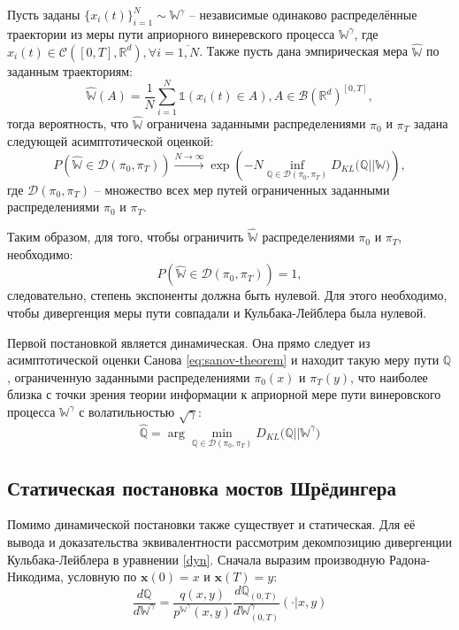 \begin{theorem}[Санов]
    Пусть заданы $\{x_i(t)\}^N_{i=1}\sim \mathbb{W}^\gamma$ -- независимые одинаково распределённые траектории из меры пути априорного винеревского процесса $\mathbb{W}^\gamma$, где $x_i (t) \in \mathcal{C}([0,T], \mathbb{R}^d), \forall i=\overline{1, N}$. Также пусть дана эмпирическая мера $\hat{\mathbb{W}}$ по заданным траекториям:
    \begin{equation*}
        \hat{\mathbb{W}}(A)=\frac{1}{N}\sum_{i=1}^N\mathds{1}\left(x_i(t)\in A\right), A\in \mathcal{B}(\mathbb{R}^d)^{[0,T]},
    \end{equation*}
    тогда вероятность, что $\hat{\mathbb{W}}$ ограничена заданными распределениями $\pi_0$ и $\pi_T$ задана следующей асимптотической оценкой:
    \begin{equation}
        P\left(\hat{\mathbb{W}} \in \mathcal{D}(\pi_0, \pi_T)\right) \xrightarrow{N\rightarrow \infty} \exp\left(-N\inf_{\mathbb{Q} \in \mathcal{D}(\pi_0, \pi_T)}D_{KL}\mathbb{(Q||W})\right),
        \label{eq:sanov-theorem}
    \end{equation}
    где $\mathcal{D}(\pi_0, \pi_T)$ -- множество всех мер путей ограниченных заданными распределениями $\pi_0$ и $\pi_T$.
\end{theorem}

Таким образом, для того, чтобы ограничить $\hat{\mathbb{W}}$ распределениями $\pi_0$ и $\pi_T$, необходимо:
\begin{equation*}
    P\left(\hat{\mathbb{W}} \in \mathcal{D}(\pi_0, \pi_T)\right) = 1,
\end{equation*}
следовательно, степень экспоненты должна быть нулевой. Для этого необходимо, чтобы дивергенция меры пути совпадали и Кульбака-Лейблера была нулевой.

Первой постановкой является динамическая. Она прямо следует из асимптотической оценки Санова \ref{eq:sanov-theorem} и находит такую меру пути $\mathbb{Q}$, ограниченную заданными распределениями $\pi_0(x)$ и $\pi_T(y)$, что наиболее близка с точки зрения теории информации к априорной мере пути винеровского процесса $\mathbb{W}^\gamma$ с волатильностью $\sqrt\gamma$:
\begin{equation}
    \hat{\mathbb{Q}} = \arg\min_{\mathbb{Q}\in \mathcal{D}(\pi_0, \pi_T)} D_{KL}\mathbb{(Q||W}^\gamma)
    \label{dyn}
\end{equation}

\subsection{Статическая постановка мостов Шрёдингера}
Помимо динамической постановки также существует и статическая. Для её вывода и доказательства эквивалентности рассмотрим декомпозицию дивергенции Кульбака-Лейблера в уравнении \ref{dyn}. Сначала выразим производную Радона-Никодима, условную по $\textbf{x}(0)=x$ и $\textbf{x}(T)=y$:
\begin{equation*}
    \frac{d\mathbb{Q}}{d\mathbb{W}^\gamma} = \frac{q(x, y)}{p^{\mathbb{W}^\gamma}(x, y)}\frac{d\mathbb{Q}_{(0,T)}}{d\mathbb{W}^\gamma_{(0,T)}}(\cdot|x,y)
\end{equation*}

